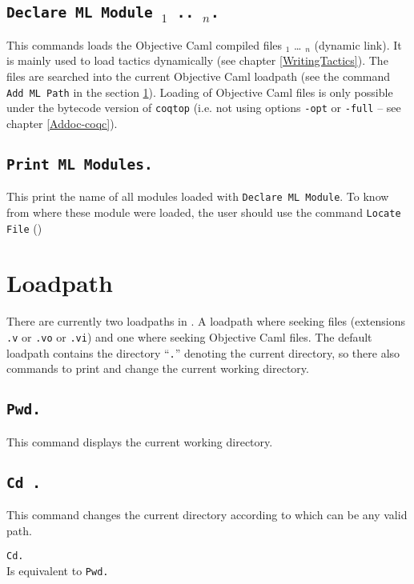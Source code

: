 \subsection{\tt Declare ML Module {\str$_1$} .. {\str$_n$}.}
This commands loads the Objective Caml compiled files {\str$_1$} \dots
{\str$_n$} (dynamic link). It is mainly used to load tactics
dynamically (see chapter \ref{WritingTactics}).  The files are
searched into the current Objective Caml loadpath (see the command {\tt
Add ML Path} in the section \ref{loadpath}).  Loading of Objective Caml
files is only possible under the bytecode version of {\tt coqtop}
(i.e. not using options {\tt -opt} or {\tt -full} -- see chapter 
\ref{Addoc-coqc}).

\subsection{\tt Print ML Modules.}
This print the name of all \ocaml modules loaded with \texttt{Declare
  ML Module}. To know from where these module were loaded, the user
should use the command \texttt{Locate File} (\pageref{Locate File})

\section{Loadpath}
\label{loadpath}

There are currently two loadpaths in \Coq. A loadpath where seeking
{\Coq} files (extensions {\tt .v} or {\tt .vo} or {\tt .vi}) and one where
seeking Objective Caml files. The default loadpath contains the
directory ``\texttt{.}'' denoting the current directory, so there also
commands to print and change the current working directory.

\subsection{\tt Pwd.}\label{Pwd}
This command displays the current working directory.

\subsection{\tt Cd {\str}.}
This command changes the current directory according to {\str} 
which can be any valid path.

\begin{Variants}
\item {\tt Cd.}\\
  Is equivalent to {\tt Pwd.}
\end{Variants}

